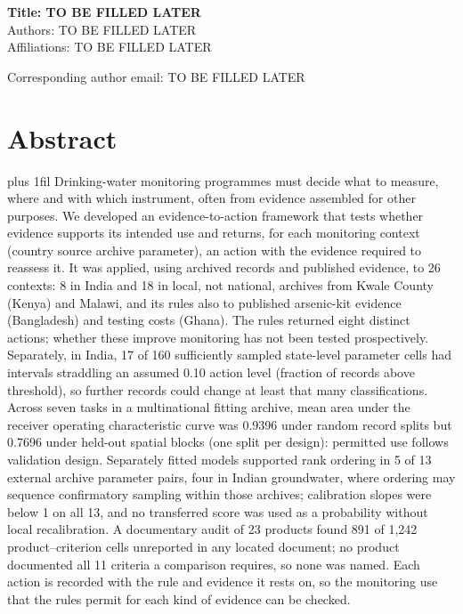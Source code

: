 \documentclass[10pt,letterpaper]{article}
\begin{document}
\vspace*{0.2in}

\begin{flushleft}
{\Large
\textbf{Title: TO BE FILLED LATER} %
}
\newline
\\
Authors: TO BE FILLED LATER
\\
\bigskip
Affiliations: TO BE FILLED LATER
\\
\bigskip

Corresponding author email: TO BE FILLED LATER

\end{flushleft}
\section*{Abstract}
{\rightskip=0pt\parfillskip=0pt plus 1fil Drinking-water monitoring programmes must decide what to measure, where and with which instrument, often from evidence assembled for other purposes. We developed an evidence-to-action framework that tests whether evidence supports its intended use and returns, for each monitoring context (country \texttimes{} source archive \texttimes{} parameter), an action with the evidence required to reassess it. It was applied, using archived records and published evidence, to 26 contexts: 8 in India and 18 in local, not national, archives from Kwale County (Kenya) and Malawi, and its rules also to published arsenic-kit evidence (Bangladesh) and testing costs (Ghana). The rules returned eight distinct actions; whether these improve monitoring has not been tested prospectively. Separately, in India, 17 of 160 sufficiently sampled state-level parameter cells had intervals straddling an assumed 0.10 action level (fraction of records above threshold), so further records could change at least that many classifications. Across seven tasks in a multinational fitting archive, mean area under the receiver operating characteristic curve was 0.9396 under random record splits but 0.7696 under held-out spatial blocks (one split per design): permitted use follows validation design. Separately fitted models supported rank ordering in 5 of 13 external archive \texttimes{} parameter pairs, four in Indian groundwater, where ordering may sequence confirmatory sampling within those archives; calibration slopes were below 1 on all 13, and no transferred score was used as a probability without local recalibration. A documentary audit of 23 products found 891 of 1,242 product--criterion cells unreported in any located document; no product documented all 11 criteria a comparison requires, so none was named. Each action is recorded with the rule and evidence it rests on, so the monitoring use that the rules permit for each kind of evidence can be checked.\par}
\end{document}
